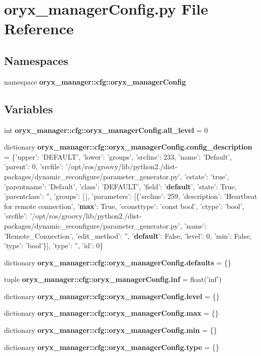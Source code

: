 \section{oryx\-\_\-manager\-Config.\-py \-File \-Reference}
\label{oryx__managerConfig_8py}
\subsection*{\-Namespaces}
\begin{DoxyCompactItemize}
\item 
namespace {\bf oryx\-\_\-manager\-::cfg\-::oryx\-\_\-manager\-Config}
\end{DoxyCompactItemize}
\subsection*{\-Variables}
\begin{DoxyCompactItemize}
\item 
int {\bf oryx\-\_\-manager\-::cfg\-::oryx\-\_\-manager\-Config.\-all\-\_\-level} = 0
\item 
dictionary {\bf oryx\-\_\-manager\-::cfg\-::oryx\-\_\-manager\-Config.\-config\-\_\-description} = \{'upper'\-: '\-D\-E\-F\-A\-U\-L\-T', 'lower'\-: 'groups', 'srcline'\-: 233, 'name'\-: '\-Default', 'parent'\-: 0, 'srcfile'\-: '/opt/ros/groovy/lib/python2./dist-\/packages/dynamic\-\_\-reconfigure/parameter\-\_\-generator.\-py', 'cstate'\-: 'true', 'parentname'\-: '\-Default', 'class'\-: '\-D\-E\-F\-A\-U\-L\-T', 'field'\-: '{\bf default}', 'state'\-: \-True, 'parentclass'\-: '', 'groups'\-: [$\,$], 'parameters'\-: [\{'srcline'\-: 259, 'description'\-: '\-Heartbeat for remote connection', '{\bf max}'\-: \-True, 'cconsttype'\-: 'const bool', 'ctype'\-: 'bool', 'srcfile'\-: '/opt/ros/groovy/lib/python2./dist-\/packages/dynamic\-\_\-reconfigure/parameter\-\_\-generator.\-py', 'name'\-: '\-Remote\-\_\-\-Connection', 'edit\-\_\-method'\-: '', '{\bf default}'\-: \-False, 'level'\-: 0, 'min'\-: \-False, 'type'\-: 'bool'\}], 'type'\-: '', 'id'\-: 0\}
\item 
dictionary {\bf oryx\-\_\-manager\-::cfg\-::oryx\-\_\-manager\-Config.\-defaults} = \{\}
\item 
tuple {\bf oryx\-\_\-manager\-::cfg\-::oryx\-\_\-manager\-Config.\-inf} = float('inf')
\item 
dictionary {\bf oryx\-\_\-manager\-::cfg\-::oryx\-\_\-manager\-Config.\-level} = \{\}
\item 
dictionary {\bf oryx\-\_\-manager\-::cfg\-::oryx\-\_\-manager\-Config.\-max} = \{\}
\item 
dictionary {\bf oryx\-\_\-manager\-::cfg\-::oryx\-\_\-manager\-Config.\-min} = \{\}
\item 
dictionary {\bf oryx\-\_\-manager\-::cfg\-::oryx\-\_\-manager\-Config.\-type} = \{\}
\end{DoxyCompactItemize}
